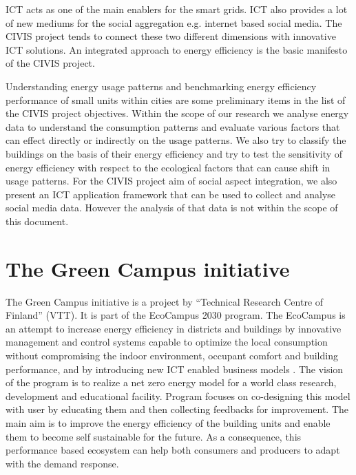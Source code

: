 ICT acts as one of the main enablers for the smart grids. ICT also provides a lot of new mediums for the social aggregation e.g. internet based social media. The CIVIS project tends to connect these two different dimensions with innovative ICT solutions. An integrated approach to energy efficiency is the basic manifesto of the CIVIS project. \cite{civisproposal}

Understanding energy usage patterns and benchmarking energy efficiency performance of small units within cities are some preliminary items in the list of the CIVIS project objectives. Within the scope of our research we analyse energy data to understand the consumption patterns and evaluate various factors that can effect directly or indirectly on the usage patterns. We also try to classify the buildings on the basis of their energy efficiency and try to test the sensitivity of energy efficiency with respect to the ecological factors that can cause shift in usage patterns. For the CIVIS project aim of social aspect integration, we also present an ICT application framework that can be used to collect and analyse social media data. However the analysis of that data is not within the scope of this document. 


\section{The Green Campus initiative} \label{greencamp}

The Green Campus initiative is a project by ``Technical Research Centre of Finland'' (VTT). It is part of the EcoCampus 2030 program. The EcoCampus is an attempt to increase energy efficiency in districts and buildings by innovative management and control systems capable to optimize the local consumption without compromising the indoor environment, occupant comfort and building performance, and by introducing new ICT enabled business models \cite{ greencampus}. The vision of the program is to realize a net zero energy model for a world class research, development and educational facility. Program focuses on co-designing this model with user by educating them and then collecting feedbacks for improvement. The main aim is to improve the energy efficiency of the building units and enable them to become self sustainable for the future. As a consequence, this performance based ecosystem can help both consumers and producers to adapt with the demand response.


